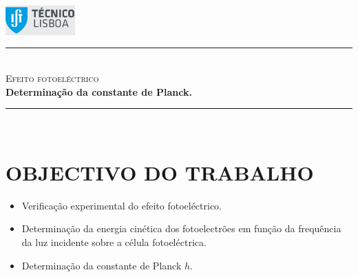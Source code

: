 \documentclass[a4paper,12pt]{article}  %
\author{Prof. Bernardo B. Carvalho}
\date{ Setembro  2015}
\newcommand{\HRule}{\rule{\linewidth}{0.5mm}}
\begin{document}
 

	\includegraphics[width=0.2\textwidth]{../logo-ist}%

	\HRule \\[0.5cm]
	{ \huge \sf  \textsc{Efeito fotoeléctrico}} \\[0.4cm] %
	{ \large \bfseries Determinação da constante de Planck.}\\
	\HRule \\%

\section{\sf OBJECTIVO DO TRABALHO}
\begin{itemize}
\item Verificação experimental do efeito fotoeléctrico.
\item Determinação da energia cinética dos fotoelectrões em função da frequência da luz incidente sobre a célula fotoeléctrica.
\item  Determinação da constante de Planck $h$.
\end{itemize}
\end{document}
